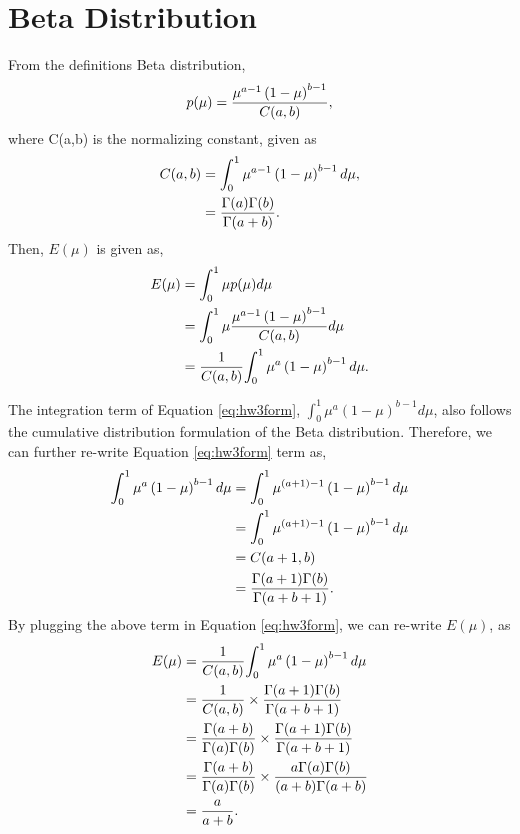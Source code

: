 \documentclass[journal,onecolumn,12pt]{IEEEtran}
\begin{document}
\pagebreak
\section{Beta Distribution}
From the definitions Beta distribution,
\begin{equation}
\begin{aligned}
p(\mu) = {{\mu^{a-1} \left( 1- \mu \right)^{b-1}} \over {C(a,b)}},
\end{aligned}
\end{equation}
where C(a,b) is the normalizing constant, given as
\begin{equation}
\begin{aligned}
C(a,b) &= {\int_0^1 \mu^{a-1} \left( 1- \mu \right)^{b-1} d\mu},\\
& = {{\Gamma (a) \Gamma (b)}\over{\Gamma (a+b)}}.
\end{aligned}
\end{equation}
Then, $E(\mu)$ is given as,
\begin{equation}
\begin{aligned}
E(\mu)
 &= {\int_0^1 \mu p(\mu) d\mu}\\
 &= {\int_0^1 \mu { {\mu^{a-1} \left( 1- \mu \right)^{b-1}} \over {C(a,b)}}d\mu}\\
 &= {1\over {C(a,b)}} {\int_0^1 \mu^a \left( 1- \mu \right)^{b-1} d\mu}.
\end{aligned}
\label{eq:hw3form}
\end{equation}

The integration term of Equation \ref{eq:hw3form}, $\int_0^1 \mu^{a} \left( 1- \mu \right)^{b-1} d\mu$, also follows the cumulative distribution formulation of the Beta distribution. Therefore, we can further re-write Equation \ref{eq:hw3form} term as,
\begin{equation}
\begin{aligned}
\int_0^1 \mu^a \left( 1- \mu \right)^{b-1} d\mu
 &= \int_0^1 \mu^{(a+1)-1} \left( 1- \mu \right)^{b-1} d\mu\\
 &= \int_0^1 \mu^{(a+1)-1} \left( 1- \mu \right)^{b-1} d\mu\\
 & = {C(a+1, b)}\\
 & = {{\Gamma (a+1) \Gamma (b)}\over{\Gamma (a+b+1)}}.
 \end{aligned}
\end{equation}
By plugging the above term in Equation \ref{eq:hw3form}, we can re-write $E(\mu)$, as
\begin{equation}
\begin{aligned}
E(\mu)
 &={1\over {C(a,b)}}{\int_0^1 \mu^a \left( 1- \mu \right)^{b-1} d\mu}\\
 &= {1\over {C(a,b)}} \times {{\Gamma (a+1) \Gamma (b)}\over{\Gamma (a+b+1)}}\\
 &= {{\Gamma (a+b)}\over{\Gamma (a) \Gamma (b)}} \times {{\Gamma (a+1) \Gamma (b)}\over{\Gamma (a+b+1)}}\\
 &= {{\Gamma (a+b)}\over{\Gamma (a) \Gamma (b)}} \times {{a\Gamma (a) \Gamma (b)}\over{(a+b) \Gamma (a+b)}}\\
 &= {a \over{a+b}}.\\
\end{aligned}
\end{equation}
\end{document}
